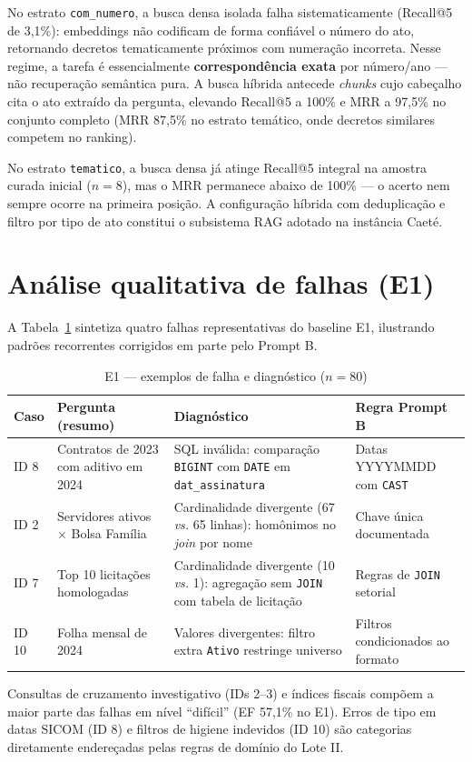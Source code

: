 No estrato \texttt{com\_numero}, a busca densa isolada falha sistematicamente (Recall@5 de 3,1\%): embeddings não codificam de forma confiável o número do ato, retornando decretos tematicamente próximos com numeração incorreta. Nesse regime, a tarefa é essencialmente \textbf{correspondência exata} por número/ano --- não recuperação semântica pura. A busca híbrida antecede \textit{chunks} cujo cabeçalho cita o ato extraído da pergunta, elevando Recall@5 a 100\% e MRR a 97,5\% no conjunto completo (MRR 87,5\% no estrato temático, onde decretos similares competem no ranking).

No estrato \texttt{tematico}, a busca densa já atinge Recall@5 integral na amostra curada inicial ($n=8$), mas o MRR permanece abaixo de 100\% --- o acerto nem sempre ocorre na primeira posição. A configuração híbrida com deduplicação e filtro por tipo de ato constitui o subsistema RAG adotado na instância Caeté.

\section{Análise qualitativa de falhas (E1)}

A Tabela~\ref{tab:erros} sintetiza quatro falhas representativas do baseline E1, ilustrando padrões recorrentes corrigidos em parte pelo Prompt B.

\begin{table}[htbp]
\centering
\caption{E1 --- exemplos de falha e diagnóstico ($n=80$)}
\label{tab:erros}
\small
\begin{tabular}{p{2.2cm}p{4.2cm}p{4.2cm}p{3.8cm}}
\toprule
\textbf{Caso} & \textbf{Pergunta (resumo)} & \textbf{Diagnóstico} & \textbf{Regra Prompt B} \\
\midrule
ID 8 & Contratos de 2023 com aditivo em 2024 & SQL inválida: comparação \texttt{BIGINT} com \texttt{DATE} em \texttt{dat\_assinatura} & Datas YYYYMMDD com \texttt{CAST} \\
ID 2 & Servidores ativos $\times$ Bolsa Família & Cardinalidade divergente (67 \textit{vs.} 65 linhas): homônimos no \textit{join} por nome & Chave única documentada \\
ID 7 & Top 10 licitações homologadas & Cardinalidade divergente (10 \textit{vs.} 1): agregação sem \texttt{JOIN} com tabela de licitação & Regras de \texttt{JOIN} setorial \\
ID 10 & Folha mensal de 2024 & Valores divergentes: filtro extra \texttt{Ativo} restringe universo & Filtros condicionados ao formato \\
\bottomrule
\end{tabular}
\end{table}

Consultas de cruzamento investigativo (IDs 2--3) e índices fiscais compõem a maior parte das falhas em nível ``difícil'' (EF 57,1\% no E1). Erros de tipo em datas SICOM (ID 8) e filtros de higiene indevidos (ID 10) são categorias diretamente endereçadas pelas regras de domínio do Lote II.
